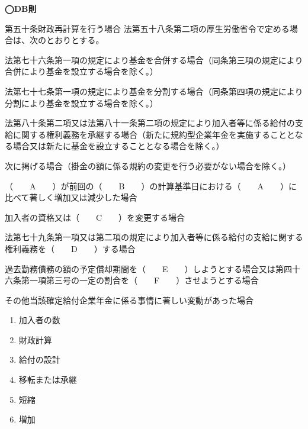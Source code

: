 \begin{fillblank}[数理人試験 H27 問題1 設問4]
  \noindent \textbf{◯DB則}
  \begin{lawstructure}
    \begin{lawarticle}{第五十条}{財政再計算を行う場合}
      法第五十八条第二項の厚生労働省令で定める場合は、次のとおりとする。

      法第七十六条第一項の規定により基金を合併する場合（同条第三項の規定により合併により基金を設立する場合を除く。）

      法第七十七条第一項の規定により基金を分割する場合（同条第四項の規定により分割により基金を設立する場合を除く。）

      法第八十条第二項又は法第八十一条第二項の規定により加入者等に係る給付の支給に関する権利義務を承継する場合（新たに規約型企業年金を実施することとなる場合又は新たに基金を設立することとなる場合を除く。）

      次に掲げる場合（掛金の額に係る規約の変更を行う必要がない場合を除く。）

      （　　A　　）が前回の（　　B　　）の計算基準日における（　　A　　）に比べて著しく増加又は減少した場合

      加入者の資格又は（　　C　　）を変更する場合

      法第七十九条第一項又は第二項の規定により加入者等に係る給付の支給に関する権利義務を（　　D　　）する場合

      過去勤務債務の額の予定償却期間を（　　E　　）しようとする場合又は第四十六条第一項第三号の一定の割合を（　　F　　）させようとする場合

      その他当該確定給付企業年金に係る事情に著しい変動があった場合
    \end{lawarticle}
  \end{lawstructure}
\end{fillblank}

\begin{answerbox}
  \begin{enumerate}[A: ]
    \item 加入者の数
    \item 財政計算
    \item 給付の設計
    \item 移転または承継
    \item 短縮
    \item 増加
  \end{enumerate}
\end{answerbox}

